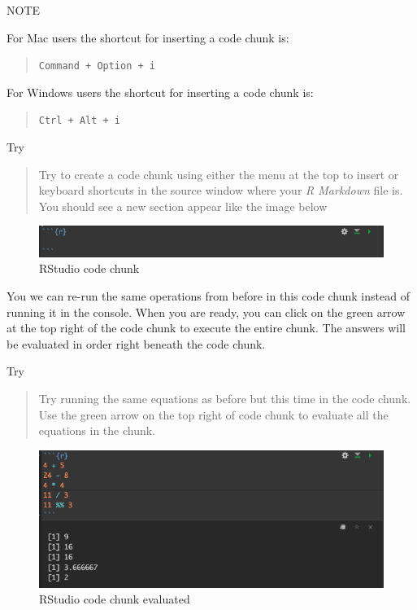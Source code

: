 \documentclass[
]{book}
\begin{document}
NOTE

For Mac users the shortcut for inserting a code chunk is:

\begin{quote}
\texttt{Command\ +\ Option\ +\ i}
\end{quote}

For Windows users the shortcut for inserting a code chunk is:

\begin{quote}
\texttt{Ctrl\ +\ Alt\ +\ i}
\end{quote}

Try

\begin{quote}
Try to create a code chunk using either the menu at the top to insert or keyboard shortcuts in the source window where your \emph{R Markdown} file is. You should see a new section appear like the image below
\end{quote}

\begin{figure}
\includegraphics[width=9.04in]{images/3.1codechunk} \caption{RStudio code chunk}\label{fig:unnamed-chunk-14}
\end{figure}

You we can re-run the same operations from before in this code chunk instead of running it in the console. When you are ready, you can click on the green arrow at the top right of the code chunk to execute the entire chunk. The answers will be evaluated in order right beneath the code chunk.

Try

\begin{quote}
Try running the same equations as before but this time in the code chunk. Use the green arrow on the top right of code chunk to evaluate all the equations in the chunk.
\end{quote}

\begin{figure}
\includegraphics[width=9.07in]{images/3.2codechunkgreen} \caption{RStudio code chunk evaluated}\label{fig:unnamed-chunk-15}
\end{figure}
\end{document}
